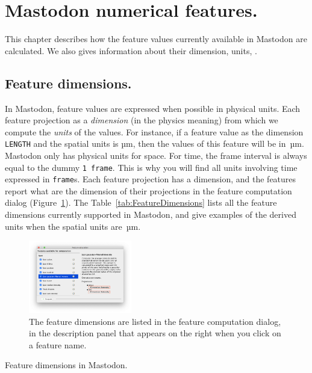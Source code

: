 \section{Mastodon numerical features.}
\label{sec:FeaturesExplanation}

This chapter describes how the feature values currently available in Mastodon are calculated. 
We also gives information about their dimension, units, \etc.

\subsection{Feature dimensions.}

In Mastodon, feature values are expressed when possible in physical units. 
Each feature projection as a \textit{dimension} (in the physics meaning) from which we compute the \textit{units} of the values.
For instance, if a feature value as the dimension \texttt{LENGTH} and the spatial units is µm, then the values of this feature will be in~µm.
Mastodon only has physical units for space. 
For time, the frame interval is always equal to the dummy \texttt{1~frame}.
This is why you will find all units involving time expressed in \texttt{frame}s.
Each feature projection has a dimension, and the features report what are the dimension of their projections in the feature computation dialog (Figure~\ref{fig:FindFeatureDimension}).
The Table~\ref{tab:FeatureDimensions} lists all the feature dimensions currently supported in Mastodon, and give examples of the derived units when the spatial units are~µm.

\begin{figure}[b]
    \centering
    \includegraphics[width=0.4\textwidth]{figures/Mastodon_FindFeatureDimension.png}
    \caption{The feature dimensions are listed in the feature computation dialog, in the description panel that appears on the right when you click on a feature name.}
    \label{fig:FindFeatureDimension}
\end{figure}

\begin{table}
    \centering
    \footnotesize
    
    \caption{Feature dimensions in Mastodon.}
    \label{tab:FeatureDimensions}
\end{table}

